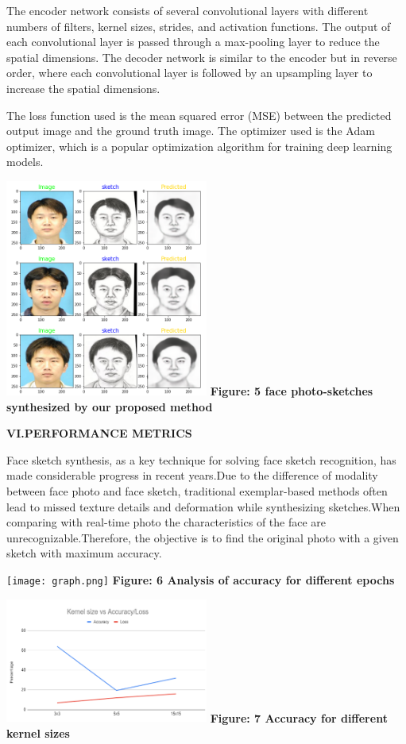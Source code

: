 \documentclass[journal]{IEEEtran} %
\begin{document}
The encoder network consists of several convolutional layers with different numbers of filters, kernel sizes, strides, and activation functions. The output of each convolutional layer is passed through a max-pooling layer to reduce the spatial dimensions. The decoder network is similar to the encoder but in reverse order, where each convolutional layer is followed by an upsampling layer to increase the spatial dimensions.

The loss function used is the mean squared error (MSE) between the predicted output image and the ground truth image. The optimizer used is the Adam optimizer, which is a popular optimization algorithm for training deep learning models.


\includegraphics[width=0.5\textwidth]{output.png}
\textbf{Figure: 5 face photo-sketches synthesized by our proposed
method }

\vspace{}

\textbf{VI.PERFORMANCE METRICS}

Face sketch synthesis, as a key technique for solving face sketch recognition, has made considerable progress in recent years.Due to the difference of modality between face photo and face sketch, traditional exemplar-based methods often lead to missed texture details and deformation while synthesizing sketches.When comparing with real-time photo the characteristics of the face are unrecognizable.Therefore, the objective is to find the original photo with a given sketch with maximum accuracy.

\texttt{[image: graph.png]}
\textbf{Figure: 6 Analysis of accuracy for different epochs}

\includegraphics[width=0.5\textwidth]{Accuracy.png}
\vspace{  }\textbf{Figure: 7  Accuracy for different kernel sizes}
\end{document}

